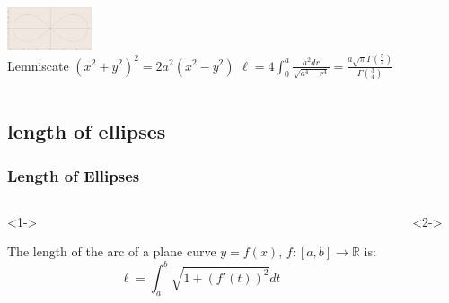 \documentclass[10pt,final]{beamer} %
\newcommand{\R}{\mathbb R}
\theoremstyle{definition}
\begin{document}
\begin{frame}
\begin{columns}[c]
\begin{column}{4cm}
\includegraphics[width=2.5cm]{images/lemniscate.pdf}\\
\scriptsize{\quad Lemniscate $(x^2+y^2)^2=2a^2(x^2-y^2)$
$\ell=4\int_0^a\frac{a^2dr}{\sqrt{a^4-r^4}}=\frac{a \sqrt\pi\Gamma(\frac54)}{\Gamma(\frac34)}$}
\end{column}
\end{columns}
\end{frame}

\subsection{length of ellipses}
\begin{frame}\frametitle{Length of Ellipses}
\begin{columns}[c]
\begin{column}{4cm}<1->\pause
\begin{scriptsize}
\begin{block}
{\scriptsize{The length of the arc of a plane curve $y=f(x)$, $f:[a,b]\rightarrow\R$
is:}}
$$\ell=\int_a^b\sqrt{1+(f'(t))^2}dt$$
\end{block}
\pause
\end{scriptsize}
\end{column}
\begin{column}{6cm}<2->
\end{column}
\end{columns}
\end{frame}
\end{document}
